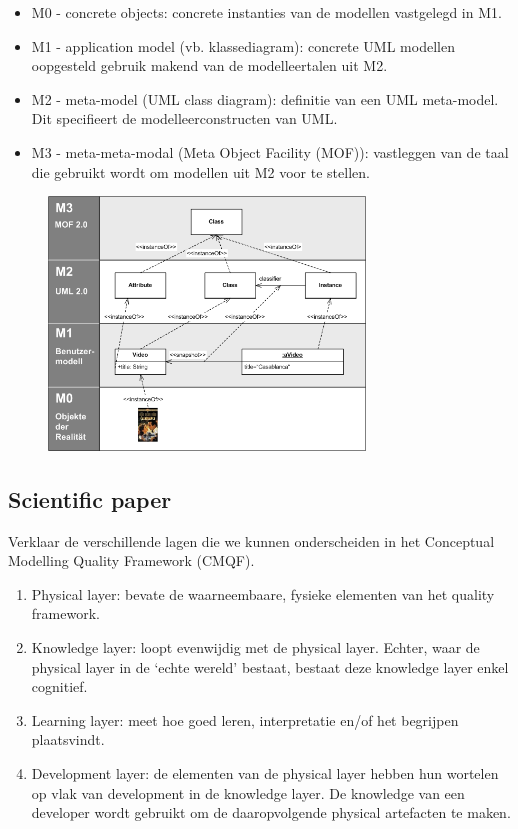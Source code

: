 \documentclass{article}
\begin{document}
\begin{itemize}
    \item M0 - concrete objects: concrete instanties van de modellen vastgelegd in M1.
    \item M1 - application model (vb. klassediagram): concrete UML modellen oopgesteld gebruik makend van de modelleertalen uit M2.
    \item M2 - meta-model (UML class diagram): definitie van een UML meta-model. Dit specifieert de modelleerconstructen van UML.
    \item M3 - meta-meta-modal (Meta Object Facility (MOF)): vastleggen van de taal die gebruikt wordt om modellen uit M2 voor te stellen.
\end{itemize}
\begin{figure}
\centering
\includegraphics[width=0.75\textwidth]{MOF}
\end{figure}

\newpage
\subsection*{Scientific paper}

\begin{quest}Verklaar de verschillende lagen die we kunnen onderscheiden in het Conceptual Modelling Quality Framework (CMQF).\end{quest}

\begin{enumerate}
    \item Physical layer: bevate de waarneembaare, fysieke elementen van het quality framework.
    \item Knowledge layer: loopt evenwijdig met de physical layer. Echter, waar de physical layer in de `echte wereld' bestaat, bestaat deze knowledge layer enkel cognitief.
    \item Learning layer: meet hoe goed leren, interpretatie en/of het begrijpen plaatsvindt.
    \item Development layer: de elementen van de physical layer hebben hun wortelen op vlak van development in de knowledge layer. De knowledge van een developer wordt gebruikt om de daaropvolgende physical artefacten te maken.
\end{enumerate}
\end{document}
